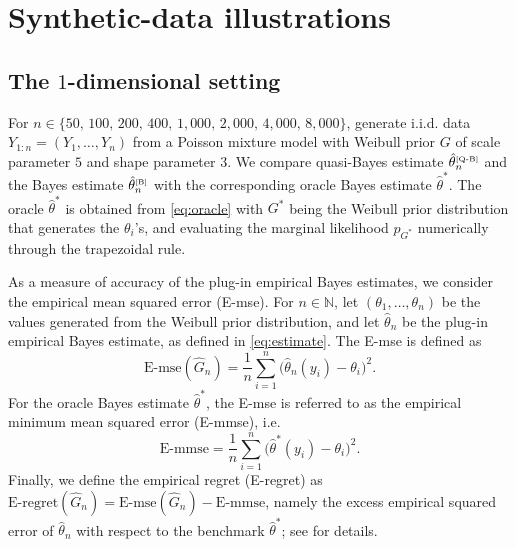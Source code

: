 \documentclass[twoside,12pt]{article}
\begin{document}
\section{Synthetic-data illustrations}\label{sec3}

\subsection{The $1$-dimensional setting}

For $n\in\{50,\,100,\,200,\,400,\,1,000,\,2,000,\,4,000,\,8,000\}$, generate i.i.d. data $Y_{1:n}=(Y_{1},\ldots,Y_{n})$ from a Poisson mixture model with Weibull prior $G$ of scale parameter $5$ and shape parameter $3$. We compare quasi-Bayes estimate $\hat{\theta}^{\text{\tiny{[Q-B]}}}_{n}$ and the Bayes estimate $\hat{\theta}^{\text{\tiny{[B]}}}_{n}$ with the corresponding oracle Bayes estimate $\hat{\theta}^{\ast}$. The oracle $\hat{\theta}^{\ast}$ is obtained from \eqref{eq:oracle} with $G^{\ast}$ being the Weibull prior distribution that generates the $\theta_{i}$'s, and evaluating the marginal likelihood $p_{G^\ast}$ numerically through the trapezoidal rule.

As a measure of accuracy of the plug-in empirical Bayes estimates, we consider the empirical mean squared error (E-mse). For $n\in\mathbb{N}$, let $(\theta_1,\ldots,\theta_n)$ be the values generated from the Weibull prior distribution, and let $\hat{\theta}_{n}$ be the plug-in empirical Bayes estimate, as defined in \eqref{eq:estimate}. The E-mse is defined as
\begin{displaymath}
\mathrm{E\text{-}mse}(\hat{G}_{n})=\frac{1}{n}\sum_{i=1}^n \bigl(\hat\theta_{n}(y_i)-\theta_i\bigr)^2.
\end{displaymath}
For the oracle Bayes estimate $\hat{\theta}^{\ast}$, the E-mse is referred to as the empirical minimum mean squared error (E-mmse), i.e.
\begin{displaymath}
\mathrm{E\text{-}mmse}=\frac{1}{n}\sum_{i=1}^n \bigl(\hat\theta^{\ast}(y_i)-\theta_i\bigr)^2.
\end{displaymath}
Finally, we define the empirical regret (E-regret) as $\mathrm{E\text{-}regret}(\hat{G}_{n})=\mathrm{E\text{-}mse}(\hat{G}_{n})-\mathrm{E\text{-}mmse}$, namely the excess empirical squared error of $\hat{\theta}_{n}$ with respect to the benchmark $\hat{\theta}^{\ast}$; see \citet{Efr(14),Efr(19)} for details.
\end{document}
